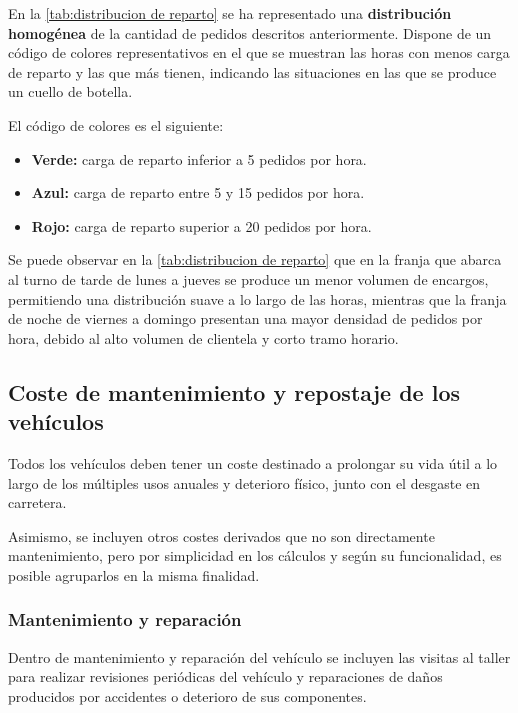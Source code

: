 En la \autoref{tab:distribucion de reparto} se ha representado una \textbf{distribución homogénea} de la cantidad de pedidos descritos anteriormente. Dispone de un código de colores representativos en el que se muestran las horas con menos carga de reparto y las que más tienen, indicando las situaciones en las que se produce un \gls{cuello de botella}.
\addtocounter{table}{-2}


El código de colores es el siguiente:
\begin{itemize}
    \item \textbf{Verde:} carga de reparto inferior a 5 pedidos por hora.
    \item \textbf{Azul:} carga de reparto entre 5 y 15 pedidos por hora.
    \item \textbf{Rojo:} carga de reparto superior a 20 pedidos por hora.
\end{itemize}

Se puede observar en la \autoref{tab:distribucion de reparto}  que en la franja que abarca al turno de tarde de lunes a jueves se produce un menor volumen de encargos, permitiendo una distribución suave a lo largo de las horas, mientras que la franja de noche de viernes a domingo presentan una mayor densidad de pedidos por hora, debido al alto volumen de clientela y corto tramo horario.

\subsection{Coste de mantenimiento y repostaje de los vehículos}
\label{conceptos_preliminares_coste_mantenimiento_repostaje}
Todos los vehículos deben tener un coste destinado a prolongar su vida útil a lo largo de los múltiples usos anuales y deterioro físico, junto con
el desgaste en carretera.

Asimismo, se incluyen otros costes derivados que no son directamente mantenimiento, pero por simplicidad en los cálculos y según su funcionalidad, es posible agruparlos en la misma finalidad.

\subsubsection{Mantenimiento y reparación}
\label{consideraciones_preliminares_mantenimiento_reparación}
Dentro de mantenimiento y reparación del vehículo se incluyen las visitas al taller para realizar revisiones periódicas del vehículo y reparaciones de daños producidos por accidentes o deterioro de sus componentes.

